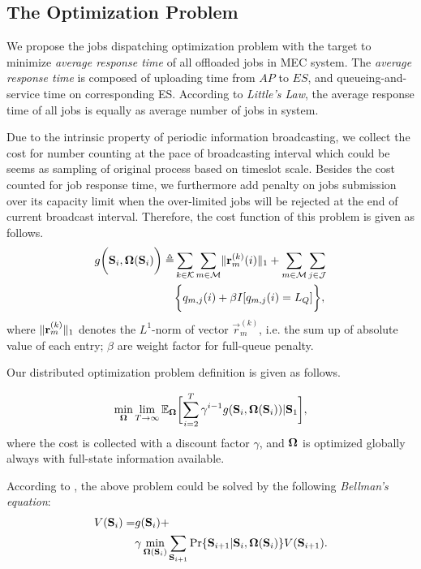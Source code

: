 \subsection{The Optimization Problem}
We propose the jobs dispatching optimization problem with the target to minimize \emph{average response time} of all offloaded jobs in MEC system.
The \emph{average response time} is composed of uploading time from $AP$ to $ES$, and queueing-and-service time on corresponding ES. According to \emph{Little's Law}, the average response time of all jobs is equally as average number of jobs in system.
        
Due to the intrinsic property of periodic information broadcasting, we collect the cost for number counting at the pace of broadcasting interval which could be seems as sampling of original process based on timeslot scale.
Besides the cost counted for job response time, we furthermore add penalty on jobs submission over its capacity limit when the over-limited jobs will be rejected at the end of current broadcast interval.
Therefore, the cost function of this problem is given as follows.
\begin{align}
    g\bigg(\mathbf{S}_{i}, \boldsymbol{\Omega}(\mathbf{S}_{i})\bigg) \triangleq& \sum_{k\in\mathcal{K}}\sum_{m\in\mathcal{M}} \lVert\mathbf{r}^{(k)}_{m}(i)\|_1 + \sum_{m\in\mathcal{M}}\sum_{j\in\mathcal{J}}
    \nonumber\\
    &\bigg\{
        q_{m,j}(i) + \beta I[q_{m,j}(i)=L_Q]
    \bigg\},
\end{align}
where $\lVert\mathbf{r}^{(k)}_{m}\|_1$ denotes the $L^1$-norm of vector $\vec{r}^{(k)}_{m}$, i.e. the sum up of absolute value of each entry; $\beta$ are weight factor for full-queue penalty.
        
Our distributed optimization problem definition is given as follows.
\begin{problem}
    \begin{gather}
        \min_{\Policy} \lim_{T \to \infty}
            \mathbb{E}_{\Policy}
                \Bracket{\sum_{i=2}^{T} \gamma^{i-1} g(\Stat_{i}, \Policy(\Stat_{i}))|\Stat_1},
    \end{gather}
    where the cost is collected with a discount factor $\gamma$, and $\boldsymbol{\Omega}$ is optimized globally always with full-state information available.
\end{problem}
According to \cite{sutton1998introduction}, the above problem could be solved by the following \emph{Bellman's equation}:
\begin{align}
    V(\mathbf{S}_i) =& g(\mathbf{S}_i) +
        \nonumber\\
        &\gamma \min_{\boldsymbol{\Omega}(\mathbf{S}_{i})} \sum_{\mathbf{S}_{i+1}} \Pr\{ \mathbf{S}_{i+1}|\mathbf{S}_{i}, \boldsymbol{\Omega}(\mathbf{S}_{i}) \} V(\mathbf{S}_{i+1}).
    \label{sp0}
\end{align}
        
